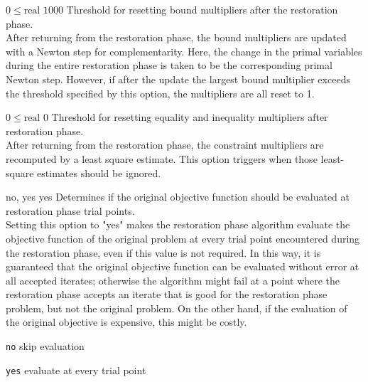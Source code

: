 %
{$0\leq\textrm{real}$}%
{$1000$}%
{Threshold for resetting bound multipliers after the restoration phase.\\
After returning from the restoration phase, the bound multipliers are updated with a Newton step for complementarity.  Here, the change in the primal variables during the entire restoration phase is taken to be the corresponding primal Newton step. However, if after the update the largest bound multiplier exceeds the threshold specified by this option, the multipliers are all reset to 1.}%
{}

%
{$0\leq\textrm{real}$}%
{$0$}%
{Threshold for resetting equality and inequality multipliers after restoration phase.\\
After returning from the restoration phase, the constraint multipliers are recomputed by a least square estimate.  This option triggers when those least-square estimates should be ignored.}%
{}

%
{\ttfamily no, yes}%
{yes}%
{Determines if the original objective function should be evaluated at restoration phase trial points.\\
Setting this option to "yes" makes the restoration phase algorithm evaluate the objective function of the original problem at every trial point encountered during the restoration phase, even if this value is not required.  In this way, it is guaranteed that the original objective function can be evaluated without error at all accepted iterates; otherwise the algorithm might fail at a point where the restoration phase accepts an iterate that is good for the restoration phase problem, but not the original problem.  On the other hand, if the evaluation of the original objective is expensive, this might be costly.}%
{\begin{list}{}{
\setlength{\parsep}{0em}
\setlength{\leftmargin}{5ex}
\setlength{\labelwidth}{2ex}
\setlength{\itemindent}{0ex}
\setlength{\topsep}{0pt}}
\item[\texttt{no}] skip evaluation
\item[\texttt{yes}] evaluate at every trial point
\end{list}
}

